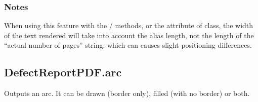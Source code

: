 \documentclass[letterpaper,10pt,english]{sphinxmanual}
\begin{document}
\begin{fulllineitems}
\begin{fulllineitems}
\begin{quote}
\begin{description}
\end{description}\end{quote}
\subsubsection*{Notes}

\sphinxAtStartPar
When using this feature with the  /  methods,
or the  attribute of  class,
the width of the text rendered will take into account the alias length,
not the length of the “actual number of pages” string,
which can causes slight positioning differences.

\end{fulllineitems}



\subsection{DefectReportPDF.arc}
\label{\detokenize{generated/quality_assessment.quality_pdf_report.DefectReportPDF.arc:defectreportpdf-arc}}\label{\detokenize{generated/quality_assessment.quality_pdf_report.DefectReportPDF.arc::doc}}

\begin{fulllineitems}
\label{\detokenize{generated/quality_assessment.quality_pdf_report.DefectReportPDF.arc:quality_assessment.quality_pdf_report.DefectReportPDF.arc}}
\sphinxAtStartPar
Outputs an arc.
It can be drawn (border only), filled (with no border) or both.
\begin{quote}


\end{quote}
\end{fulllineitems}
\end{fulllineitems}
\end{document}
